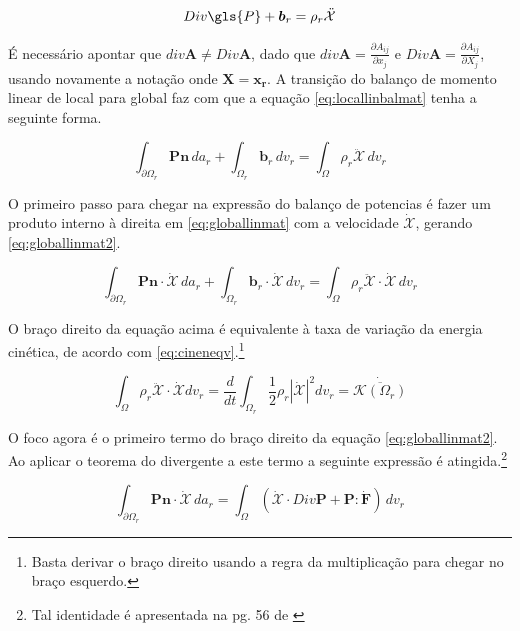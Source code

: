 \begin{equation} \label{eq:locallinbalmat}
    Div\gls{P} + \boldsymbol{b}_r = \rho_r \ddot{\mathcal{X}}
\end{equation}

É necessário apontar que $ div \boldsymbol{A} \neq Div \boldsymbol{A} $, dado que $ div \boldsymbol{A} = \frac{\partial A_{ij}}{\partial x_j} $ e $ Div \boldsymbol{A} = \frac{\partial A_{ij}}{\partial X_j} $, usando novamente a notação onde $ \boldsymbol{X = x_r}$. A transição do balanço de momento linear de local para global faz com que a equação \ref{eq:locallinbalmat} tenha a seguinte forma.

\begin{equation}
    \int_{\partial \Omega_r} \boldsymbol{Pn}\, da_r + \int_{\Omega_r} \boldsymbol{b}_r \,dv_r = \int_{\Omega} \rho_r \ddot{\mathcal{X}}\, dv_r
    \label{eq:globallinmat}
\end{equation}

O primeiro passo para chegar na expressão do balanço de potencias é fazer um produto interno à direita em \ref{eq:globallinmat} com a velocidade $ \dot{\mathcal{X}} $, gerando \ref{eq:globallinmat2}.

\begin{equation}
    \int_{\partial \Omega_r} \boldsymbol{Pn} \cdot \dot{\mathcal{X}} \, da_r + \int_{\Omega_r} \boldsymbol{b}_r \cdot \dot{\mathcal{X}} \,dv_r = \int_{\Omega} \rho_r  \ddot{\mathcal{X}} \cdot \dot{\mathcal{X}} \,dv_r
    \label{eq:globallinmat2}
\end{equation}

O braço direito da equação acima é equivalente à taxa de variação da energia cinética, de acordo com \ref{eq:cineneqv}.\footnote{Basta derivar o braço direito usando a regra da multiplicação para chegar no braço esquerdo.}

\begin{equation} \label{eq:cineneqv}
    \int_{\Omega} \rho_r  \ddot{\mathcal{X}} \cdot \dot{\mathcal{X}} dv_r = \frac{d}{dt} \int_{\Omega_r} \frac{1}{2}\rho_r |\dot{\mathcal{X}}|^2 dv_r= \dot{\overline{\mathcal{K}(\Omega_r)}}
\end{equation}

O foco agora é o primeiro termo do braço direito da equação \ref{eq:globallinmat2}. Ao aplicar o teorema do divergente a este termo a seguinte expressão é atingida.\footnote{Tal identidade é apresentada na pg. 56 de \cite{gurtin_fried_anand_2013}}

\begin{equation}
    \int_{\partial \Omega_r} \boldsymbol{Pn} \cdot \dot{\mathcal{X}} \,da_r = \int_{\Omega} (\dot{\mathcal{X}} \cdot Div\boldsymbol{P} + \boldsymbol{P} : \dot{\boldsymbol{F}} )\,dv_r
    \label{eq:transpowerbalance}
\end{equation}

